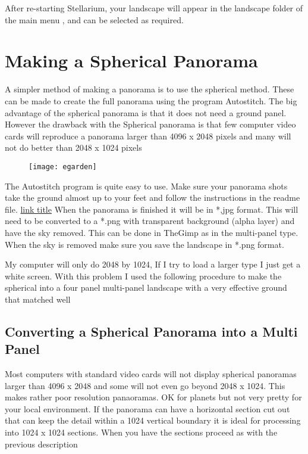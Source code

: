 After re-starting Stellarium, your landscape will appear in the
landscape folder of the main menu , and can be selected as required.

\section{Making a Spherical
Panorama}\label{making-a-spherical-panorama}

A simpler method of making a panorama is to use the spherical method.
These can be made to create the full panorama using the program
Autostitch. The big advantage of the spherical panorama is that it does
not need a ground panel. However the drawback with the Spherical
panorama is that few computer video cards will reproduce a panorama
larger than 4096 x 2048 pixels and many will not do better than 2048 x
1024 pixels

\begin{figure}[h]
\centering\texttt{[image: egarden]}
\end{figure}

The Autostitch program is quite easy to use. Make sure your panorama
shots take the ground almost up to your feet and follow the instructions
in the readme file. \href{http://www.example.com}{link title} When the
panorama is finished it will be in *,jpg format. This will need to be
converted to a *.png with transparent background (alpha layer) and have
the sky removed. This can be done in TheGimp as in the multi-panel type.
When the sky is removed make sure you save the landscape in *.png
format.

My computer will only do 2048 by 1024, If I try to load a larger type I
just get a white screen. With this problem I used the following
procedure to make the spherical into a four panel multi-panel landscape
with a very effective ground that matched well

\subsection{Converting a Spherical Panorama into a Multi
Panel}\label{converting-a-spherical-panorama-into-a-multi-panel}

Most computers with standard video cards will not display spherical
panoramas larger than 4096 x 2048 and some will not even go beyond 2048
x 1024. This makes rather poor resolution panaoramas. OK for planets but
not very pretty for your local environment. If the panorama can have a
horizontal section cut out that can keep the detail within a 1024
vertical boundary it is ideal for processing into 1024 x 1024 sections.
When you have the sections proceed as with the previous description

